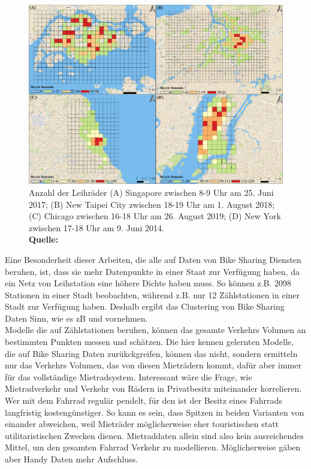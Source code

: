 \documentclass[a4paper,12pt]{thesis}
\newcommand*{\captionsource}[2]{%
	\caption[{#1}]{%
		#1%
		\\\hspace{\linewidth}%
		\textbf{Quelle:} #2%
	}%
}
\begin{document}
\begin{figure}[!ht]
	\centering
	\includegraphics[width=\textwidth]{Plots/Li2022.png}
	\captionsource{Anzahl der Leihräder (A) Singapore zwischen 8-9 Uhr am 25. Juni 2017; (B) New Taipei City zwischen 18-19 Uhr am 1. August 2018; (C) Chicago zwischen 16-18 Uhr am 26. August 2019; (D) New York zwischen 17-18 Uhr am 9. Juni 2014.}{
		\cite{Li2022}
	}
	\label{LiBild}
\end{figure}
Eine Besonderheit dieser Arbeiten, die alle auf Daten von Bike Sharing Diensten beruhen, ist, dass sie mehr Datenpunkte in einer Staat zur Verfügung haben, da ein Netz von Leihstation eine höhere Dichte haben muss. So können \cite{Gao2022} z.B. 2098 Stationen in einer Stadt beobachten, während \cite{Broucke2019} z.B. nur 12 Zählstationen in einer Stadt zur Verfügung haben. Deshalb ergibt das Clustering von Bike Sharing Daten Sinn, wie es zB \cite{Xu2013} und \cite{Li2015} vornehmen.\\
Modelle die auf Zählstationen beruhen, können das gesamte Verkehrs Volumen an bestimmten Punkten messen und schätzen. Die hier kennen gelernten Modelle, die auf Bike Sharing Daten zurükckgreifen, können das nicht, sondern ermitteln nur das Verkehrs Volumen, das von diesen Mieträdern kommt, dafür aber immer für das vollständige Mietradsystem. Interessant wäre die Frage, wie Mietradverkehr und Verkehr von Rädern in Privatbesitz miteinander korrelieren. Wer mit dem Fahrrad regulär pendelt, für den ist der Besitz eines Fahrrads langfristig kostengünstiger. So kann es sein, dass Spitzen in beiden Varianten von einander abweichen, weil Mieträder möglicherweise eher touristischen statt utilitaristischen Zwecken dienen. Mietraddaten allein sind also kein ausreichendes Mittel, um den gesamten Fahrrad Verkehr zu modellieren. Möglicherweise gäben aber Handy Daten mehr Aufschluss.
\end{document}
